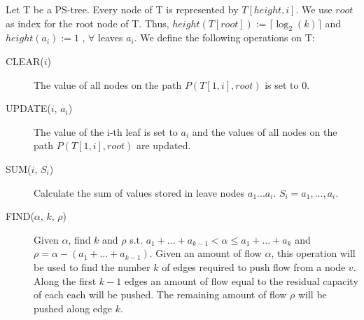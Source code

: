\documentclass[a4paper,10pt, twocolumn]{article}
\begin{document}
Let T be a PS-tree. Every node of T is represented by $T[height, i]$. We use $root$ as index for the root node of T. Thus, $height(T[root]) := \lceil \log_2(k) \rceil$ and $height(a_i) := 1$ , $\forall$ leaves $a_i$.  We define the following operations on T:
\begin{description}
	\item [CLEAR($i$)] The value of all nodes on the path $P(T[1,i],root)$ is set to 0. 
	\item [UPDATE($i$, $a_i$)] The value of the i-th leaf is set to $a_i$ and the values of all nodes on the path $P(T[1,i],root)$ are updated.
	\item [SUM($i$, $S_i$)] Calculate the sum of values stored in leave nodes $a_1...a_i$. $S_i = a_1,...,a_i$.
	\item [FIND($\alpha$, $k$, $\rho$)] Given $\alpha$, find $k$ and $\rho$ s.t. $a_1+...+a_{k-1} < \alpha \leq a_1+...+a_k$ and $\rho = \alpha - (a_1+...+a_{k-1})$. Given an amount of flow $\alpha$, this operation will be used to find the number $k$ of edges required to push flow from a node $v$. Along the first $k-1$ edges an amount of flow equal to the residual capacity of each each will be pushed. The remaining amount of flow $\rho$ will be pushed along edge $k$. 
\end{description}
\end{document}
